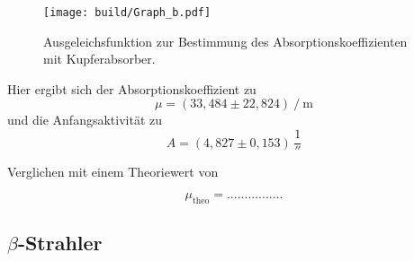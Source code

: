   \begin{figure}[H]
      \centering
      \texttt{[image: build/Graph\_b.pdf]}
      \caption{Ausgeleichsfunktion zur Bestimmung des Absorptionskoeffizienten mit Kupferabsorber.}
      \label{fig:plot2}
  \end{figure}

Hier ergibt sich der Absorptionskoeffizient zu
\begin{equation*}
    \mu =  \left(33,484 \pm 22,824\right) \mathbin{/} \unit{\meter}
\end{equation*}
und die Anfangsaktivität zu
\begin{equation*}
    A = (4,827 \pm 0,153) \, \unit{\frac{1}{\second}}
\end{equation*}

Verglichen mit einem Theoriewert von %

\begin{equation*}
    \mu_{\text{theo}} = ................ %
\end{equation*}

\subsection*{$\beta$-Strahler}

